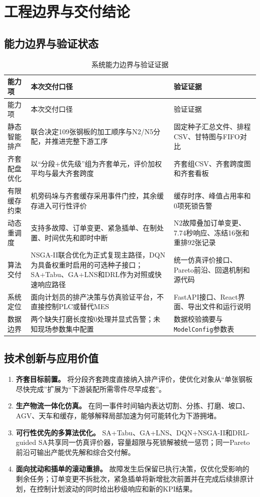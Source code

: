 \documentclass[UTF8,zihao=-4,openany]{ctexrep}
\newcommand{\code}[1]{\texttt{#1}}
\begin{document}
\chapter{工程边界与交付结论}

\section{能力边界与验证状态}

\begin{longtable}{p{}p{}p{}}
\caption{系统能力边界与验证证据}\label{tab:delivery-boundary}\\
\toprule
能力项 & 本次交付口径 & 验证证据 \\
\midrule
\endfirsthead
\toprule
能力项 & 本次交付口径 & 验证证据 \\
\midrule
\endhead
静态智能排产 & 联合决定109张钢板的加工顺序与N2/N5分配，并推进完整下游工序 & 固定种子汇总文件、排程CSV、甘特图与FIFO对比 \\
齐套配盘优化 & 以“分段+优先级”组为齐套单元，评价加权平均与最大齐套跨度 & 齐套组CSV、齐套跨度图和齐套看板 \\
有限缓存约束 & 机旁码垛与齐套缓存采用事件门控，其余缓存进入可行性评价 & 缓存时序、峰值占用率和0项死锁告警 \\
动态重调度 & 支持多故障、订单变更、紧急插单、在制处置、时间优先和即时中断 & N2故障叠加订单变更、7.74秒响应、冻结16张和重排92张记录 \\
算法交付 & NSGA-II联合优化为正式复现主路径，DQN为具备权重时启用的可选种子接口；SA+Tabu、GA+LNS和DRL作为对照或快速响应路径 & 统一仿真评价接口、Pareto前沿、回退机制和源代码 \\
系统定位 & 面向计划员的排产决策与仿真验证平台，不直接控制PLC或替代MES & FastAPI接口、React界面、导出文件和运行说明 \\
数据边界 & 两个缺失打磨长度按0处理并显式告警；未知现场参数集中配置 & 数据校验摘要与\code{ModelConfig}参数表 \\
\bottomrule
\end{longtable}

\section{技术创新与应用价值}

\begin{enumerate}
  \item \textbf{齐套目标前置。} 将分段齐套跨度直接纳入排产评价，使优化对象从“单张钢板尽快完成”扩展为“下游装配所需零件尽早成套”。
  \item \textbf{生产物流一体化仿真。} 在同一事件时间轴内表达切割、分拣、打磨、坡口、AGV、天车和缓存，能够解释局部加速为何可能转化为下游拥堵。
  \item \textbf{可行性优先的多算法优化。} SA+Tabu、GA+LNS、DQN+NSGA-II和DRL-guided SA共享同一仿真评价器，容量超限与死锁解被统一惩罚；同一Pareto前沿可输出产能优先解和综合交付解。
  \item \textbf{面向扰动和插单的滚动重排。} 故障发生后保留已执行决策，仅优化受影响的剩余任务；订单变更不拆批次，紧急插单将新增批次前置并在完成后续排原计划，在控制计划波动的同时给出秒级响应和新的KPI结果。
\end{enumerate}
\end{document}
